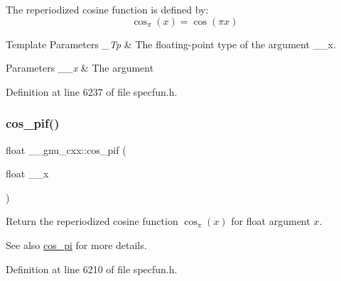 The reperiodized cosine function is defined by\+: \[ \cos_\pi(x) = \cos(\pi x) \]


\begin{DoxyTemplParams}{Template Parameters}
{\em \+\_\+\+Tp} & The floating-\/point type of the argument {\ttfamily \+\_\+\+\_\+x}. \\
\hline
\end{DoxyTemplParams}

\begin{DoxyParams}{Parameters}
{\em \+\_\+\+\_\+x} & The argument \\
\hline
\end{DoxyParams}


Definition at line 6237 of file specfun.\+h.

\mbox{\label{group__gnu__math__spec__func_gaddcae99c1572af6fa1d79b9cfa053033}} 
\subsubsection{\texorpdfstring{cos\+\_\+pif()}{cos\_pif()}}
{\footnotesize\ttfamily float \+\_\+\+\_\+gnu\+\_\+cxx\+::cos\+\_\+pif (\begin{DoxyParamCaption}\item[{float}]{\+\_\+\+\_\+x }\end{DoxyParamCaption})\hspace{0.3cm}{\ttfamily [inline]}}

Return the reperiodized cosine function $ \cos_\pi(x) $ for {\ttfamily float} argument $ x $.

\begin{DoxySeeAlso}{See also}
\hyperlink{group__gnu__math__spec__func_gafc4698ae591b0e9e61285b0794d43ef4}{cos\+\_\+pi} for more details. 
\end{DoxySeeAlso}


Definition at line 6210 of file specfun.\+h.

\mbox{\label{group__gnu__math__spec__func_ga9b6816c0abf30fd88417d79a33cb5465}} 
